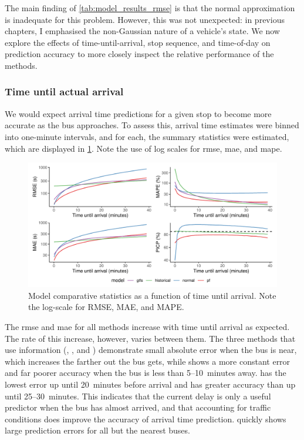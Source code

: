 The main finding of \cref{tab:model_results_rmse} is that the normal approximation is inadequate for this problem. However, this was not unexpected: in previous chapters, I emphasised the non-Gaussian nature of a vehicle's state. We now explore the effects of time-until-arrival, stop sequence, and time-of-day on prediction accuracy to more closely inspect the relative performance of the methods.


\subsubsection{Time until actual arrival}

We would expect arrival time predictions for a given stop to become more accurate as the bus approaches. To assess this, arrival time estimates were binned into one-minute intervals, and for each, the summary statistics were estimated, which are displayed in \cref{fig:model_results_rmse_time}. Note the use of log scales for \gls{rmse}, \gls{mae}, and \gls{mape}.


\begin{knitrout}\small
{}\color{fgcolor}\begin{figure}
\includegraphics[width=\textwidth]{figure/model_results_rmse_time-1} \caption[Model comparative statistics as a function of time until arrival]{Model comparative statistics as a function of time until arrival. Note the log-scale for RMSE, MAE, and MAPE.}\label{fig:model_results_rmse_time}
\end{figure}


\end{knitrout}

The \gls{rmse} and \gls{mae} for all methods increase with time until arrival as expected. The rate of this increase, however, varies between them. The three methods that use \rt{} information (\Fpf{}, \Fnorm{}, and \Fsched{}) demonstrate small absolute error when the bus is near, which increases the farther out the bus gets, while \Fhist{} shows a more constant error and far poorer accuracy when the bus is less than 5--10~minutes away. \Fpf{} has the lowest error up until 20~minutes before arrival and has greater accuracy than \Fsched{} up until 25--30~minutes. This indicates that the current delay is only a useful predictor when the bus has almost arrived, and that accounting for \rt{} traffic conditions does improve the accuracy of arrival time prediction. \Fnorm{} quickly shows large prediction errors for all but the nearest buses.



